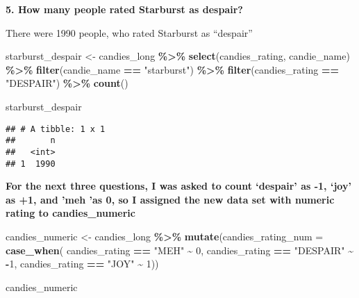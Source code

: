 \documentclass[
]{article}
\newenvironment{Shaded}{\begin{snugshade}}{\end{snugshade}}
\newcommand{\AttributeTok}[1]{\textcolor[rgb]{0.13,0.29,0.53}{#1}}
\newcommand{\DecValTok}[1]{\textcolor[rgb]{0.00,0.00,0.81}{#1}}
\newcommand{\FunctionTok}[1]{\textcolor[rgb]{0.13,0.29,0.53}{\textbf{#1}}}
\newcommand{\NormalTok}[1]{#1}
\newcommand{\OtherTok}[1]{\textcolor[rgb]{0.56,0.35,0.01}{#1}}
\newcommand{\SpecialCharTok}[1]{\textcolor[rgb]{0.81,0.36,0.00}{\textbf{#1}}}
\newcommand{\StringTok}[1]{\textcolor[rgb]{0.31,0.60,0.02}{#1}}
\begin{document}
\textbf{5. How many people rated Starburst as despair?}

There were 1990 people, who rated Starburst as ``despair''

\begin{Shaded}
\begin{Highlighting}[]
\NormalTok{starburst\_despair }\OtherTok{\textless{}{-}}\NormalTok{ candies\_long }\SpecialCharTok{\%\textgreater{}\%} 
  \FunctionTok{select}\NormalTok{(candies\_rating, candie\_name) }\SpecialCharTok{\%\textgreater{}\%} 
  \FunctionTok{filter}\NormalTok{(candie\_name }\SpecialCharTok{==} \StringTok{"starburst"}\NormalTok{) }\SpecialCharTok{\%\textgreater{}\%} 
  \FunctionTok{filter}\NormalTok{(candies\_rating }\SpecialCharTok{==} \StringTok{"DESPAIR"}\NormalTok{) }\SpecialCharTok{\%\textgreater{}\%} 
  \FunctionTok{count}\NormalTok{()}

\NormalTok{starburst\_despair}
\end{Highlighting}
\end{Shaded}

\begin{verbatim}
## # A tibble: 1 x 1
##       n
##   <int>
## 1  1990
\end{verbatim}

\textbf{For the next three questions, I was asked to count `despair' as
-1, `joy' as +1, and 'meh 'as 0, so I assigned the new data set with
numeric rating to candies\_numeric}

\begin{Shaded}
\begin{Highlighting}[]
\NormalTok{candies\_numeric }\OtherTok{\textless{}{-}}\NormalTok{ candies\_long }\SpecialCharTok{\%\textgreater{}\%} \FunctionTok{mutate}\NormalTok{(}\AttributeTok{candies\_rating\_num =} \FunctionTok{case\_when}\NormalTok{(}
\NormalTok{  candies\_rating }\SpecialCharTok{==} \StringTok{"MEH"} \SpecialCharTok{\textasciitilde{}} \DecValTok{0}\NormalTok{,}
\NormalTok{  candies\_rating }\SpecialCharTok{==} \StringTok{"DESPAIR"} \SpecialCharTok{\textasciitilde{}} \SpecialCharTok{{-}}\DecValTok{1}\NormalTok{,}
\NormalTok{  candies\_rating }\SpecialCharTok{==} \StringTok{"JOY"} \SpecialCharTok{\textasciitilde{}} \DecValTok{1}\NormalTok{))}

\NormalTok{candies\_numeric}
\end{Highlighting}
\end{Shaded}
\end{document}
